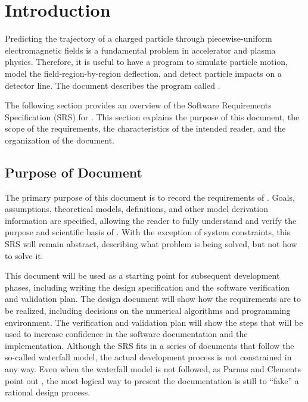 \documentclass[12pt]{article}
\begin{document}
\newpage


\section{Introduction}

Predicting the trajectory of a charged particle through piecewise-uniform
electromagnetic fields is a fundamental problem in accelerator and plasma physics.
Therefore, it is useful to have a program to simulate particle motion, model the
field-region-by-region deflection, and detect particle impacts on a detector line.
The document describes the program called \progname{}.

The following section provides an overview of the Software Requirements
Specification (SRS) for \progname{}.  This section explains the purpose of this
document, the scope of the requirements, the characteristics of the intended reader,
and the organization of the document.

\subsection{Purpose of Document}

The primary purpose of this document is to record the requirements of \progname{}.
Goals, assumptions, theoretical models, definitions, and other model derivation
information are specified, allowing the reader to fully understand and verify the
purpose and scientific basis of \progname{}.  With the exception of system
constraints, this SRS will remain abstract, describing what problem is being solved,
but not how to solve it.

This document will be used as a starting point for subsequent development phases,
including writing the design specification and the software verification and
validation plan.  The design document will show how the requirements are to be
realized, including decisions on the numerical algorithms and programming
environment.  The verification and validation plan will show the steps that will be
used to increase confidence in the software documentation and the implementation.
Although the SRS fits in a series of documents that follow the so-called waterfall
model, the actual development process is not constrained in any way.  Even when the
waterfall model is not followed, as Parnas and Clements point out
\cite{ParnasAndClements1986}, the most logical way to present the documentation is
still to ``fake'' a rational design process.
\end{document}
